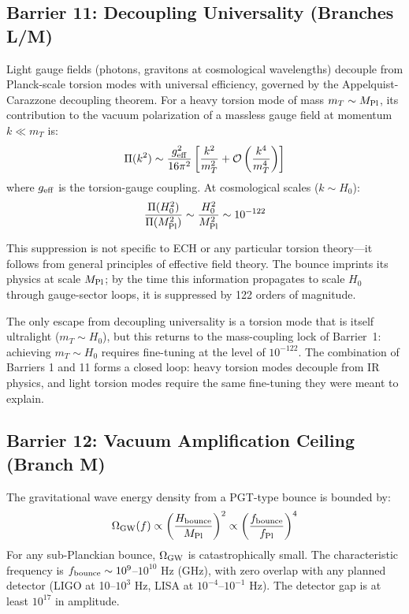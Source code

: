 \documentclass[aps,prd,twocolumn,superscriptaddress,showpacs,preprintnumbers,nofootinbib,longbibliography,floatfix]{revtex4-2}
\newcommand{\MPl}{M_{\rm Pl}}
\begin{document}
\subsection{Barrier 11: Decoupling Universality (Branches L/M)}

Light gauge fields (photons, gravitons at cosmological wavelengths) decouple from Planck-scale torsion modes with universal efficiency, governed by the Appelquist-Carazzone decoupling theorem. For a heavy torsion mode of mass $m_T \sim \MPl$, its contribution to the vacuum polarization of a massless gauge field at momentum $k \ll m_T$ is:
\begin{equation}
\Pi(k^2) \sim \frac{g_{\rm eff}^2}{16\pi^2}\left[\frac{k^2}{m_T^2} + \mathcal{O}\left(\frac{k^4}{m_T^4}\right)\right]
\end{equation}
where $g_{\rm eff}$ is the torsion-gauge coupling. At cosmological scales ($k \sim H_0$):
\begin{equation}
\frac{\Pi(H_0^2)}{\Pi(\MPl^2)} \sim \frac{H_0^2}{\MPl^2} \sim 10^{-122}
\end{equation}

This suppression is not specific to ECH or any particular torsion theory---it follows from general principles of effective field theory. The bounce imprints its physics at scale $\MPl$; by the time this information propagates to scale $H_0$ through gauge-sector loops, it is suppressed by 122 orders of magnitude.

The only escape from decoupling universality is a torsion mode that is itself ultralight ($m_T \sim H_0$), but this returns to the mass-coupling lock of Barrier~1: achieving $m_T \sim H_0$ requires fine-tuning at the level of $10^{-122}$. The combination of Barriers 1 and 11 forms a closed loop: heavy torsion modes decouple from IR physics, and light torsion modes require the same fine-tuning they were meant to explain.

\subsection{Barrier 12: Vacuum Amplification Ceiling (Branch M)}

The gravitational wave energy density from a PGT-type bounce is bounded by:
\begin{equation}
\Omega_{\rm GW}(f) \propto \left(\frac{H_{\rm bounce}}{\MPl}\right)^2 \propto \left(\frac{f_{\rm bounce}}{f_{\rm Pl}}\right)^4
\end{equation}
For any sub-Planckian bounce, $\Omega_{\rm GW}$ is catastrophically small. The characteristic frequency is $f_{\rm bounce} \sim 10^9$--$10^{10}$ Hz (GHz), with zero overlap with any planned detector (LIGO at 10--$10^3$ Hz, LISA at $10^{-4}$--$10^{-1}$ Hz). The detector gap is at least $10^{17}$ in amplitude.
\end{document}
